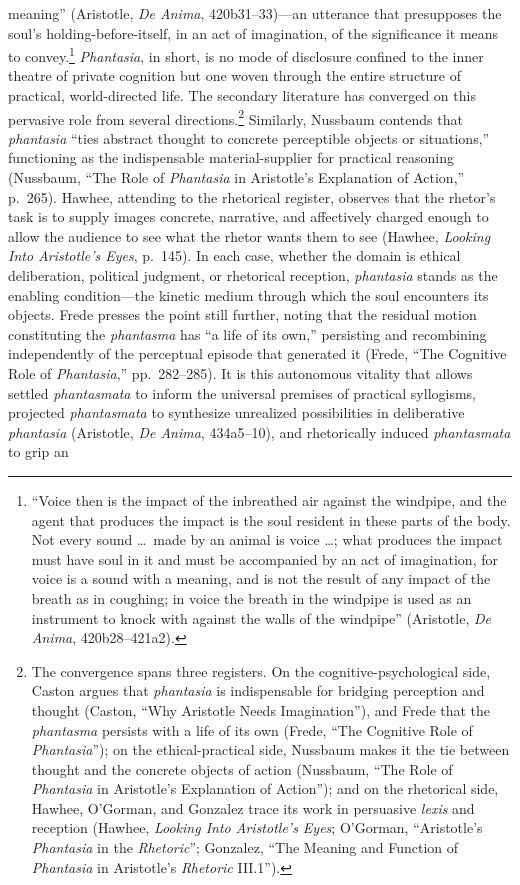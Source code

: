 \documentclass{article}
\begin{document}
meaning'' (Aristotle, \textit{De Anima}, 420b31--33)---an utterance that presupposes the soul's holding-before-itself, in an act of imagination, of the significance it means to convey.\footnote{``Voice then is the impact of the inbreathed air against the windpipe, and the agent that produces the impact is the soul resident in these parts of the body. Not every sound \ldots\ made by an animal is voice \ldots; what produces the impact must have soul in it and must be accompanied by an act of imagination, for voice is a sound with a meaning, and is not the result of any impact of the breath as in coughing; in voice the breath in the windpipe is used as an instrument to knock with against the walls of the windpipe'' (Aristotle, \textit{De Anima}, 420b28--421a2).} \textit{Phantasia}, in short, is no mode of disclosure confined to the inner theatre of private cognition but one woven through the entire structure of practical, world-directed life. The secondary literature has converged on this pervasive role from several directions.\footnote{The convergence spans three registers. On the cognitive-psychological side, Caston argues that \textit{phantasia} is indispensable for bridging perception and thought (Caston, ``Why Aristotle Needs Imagination''), and Frede that the \textit{phantasma} persists with a life of its own (Frede, ``The Cognitive Role of \textit{Phantasia}''); on the ethical-practical side, Nussbaum makes it the tie between thought and the concrete objects of action (Nussbaum, ``The Role of \textit{Phantasia} in Aristotle's Explanation of Action''); and on the rhetorical side, Hawhee, O'Gorman, and Gonzalez trace its work in persuasive \textit{lexis} and reception (Hawhee, \textit{Looking Into Aristotle's Eyes}; O'Gorman, ``Aristotle's \textit{Phantasia} in the \textit{Rhetoric}''; Gonzalez, ``The Meaning and Function of \textit{Phantasia} in Aristotle's \textit{Rhetoric} III.1'').} Similarly, Nussbaum contends that \textit{phantasia} ``ties abstract thought to concrete perceptible objects or situations,'' functioning as the indispensable material-supplier for practical reasoning (Nussbaum, ``The Role of \textit{Phantasia} in Aristotle's Explanation of Action,'' p.~265). Hawhee, attending to the rhetorical register, observes that the rhetor's task is to supply images concrete, narrative, and affectively charged enough to allow the audience to see what the rhetor wants them to see (Hawhee, \textit{Looking Into Aristotle's Eyes}, p.~145). In each case, whether the domain is ethical deliberation, political judgment, or rhetorical reception, \textit{phantasia} stands as the enabling condition---the kinetic medium through which the soul encounters its objects. Frede presses the point still further, noting that the residual motion constituting the \textit{phantasma} has ``a life of its own,'' persisting and recombining independently of the perceptual episode that generated it (Frede, ``The Cognitive Role of \textit{Phantasia},'' pp.~282--285). It is this autonomous vitality that allows settled \textit{phantasmata} to inform the universal premises of practical syllogisms, projected \textit{phantasmata} to synthesize unrealized possibilities in deliberative \textit{phantasia} (Aristotle, \textit{De Anima}, 434a5--10), and rhetorically induced \textit{phantasmata} to grip an 
\end{document}
